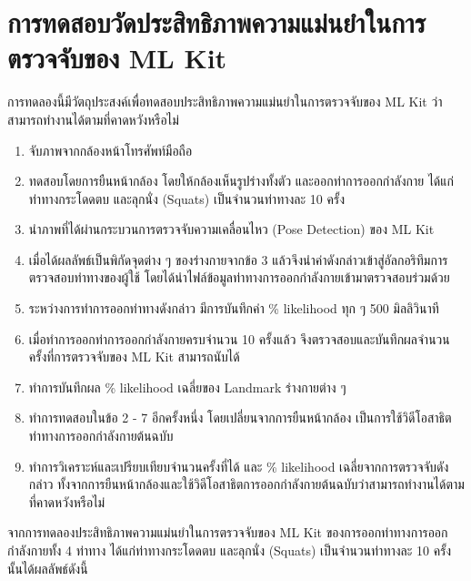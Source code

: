 \section{การทดสอบวัดประสิทธิภาพความแม่นยำในการตรวจจับของ ML Kit}
การทดลองนี้มีวัตถุประสงค์เพื่อทดสอบประสิทธิภาพความแม่นยำในการตรวจจับของ ML Kit ว่าสามารถทำงานได้ตามที่คาดหวังหรือไม่
\begin{enumerate}
	\item จับภาพจากกล้องหน้าโทรศัพท์มือถือ
	\item ทดสอบโดยการยืนหน้ากล้อง โดยให้กล้องเห็นรูปร่างทั้งตัว และออกท่าการออกกำลังกาย ได้แก่ท่าทางกระโดดตบ และลุกนั่ง (Squats) เป็นจำนวนท่าทางละ 10 ครั้ง
	\item นำภาพที่ได้ผ่านกระบวนการตรวจจับความเคลื่อนไหว (Pose Detection) ของ ML Kit
	\item เมื่อได้ผลลัพธ์เป็นพิกัดจุดต่าง ๆ ของร่างกายจากข้อ 3 แล้วจึงนำค่าดังกล่าวเข้าสู่อัลกอริทึมการตรวจสอบท่าทางของผู้ใช้ โดยได้นำไฟล์ข้อมูลท่าทางการออกกำลังกายเข้ามาตรวจสอบร่วมด้วย
	\item ระหว่างการทำการออกท่าทางดังกล่าว มีการบันทึกค่า \% likelihood ทุก ๆ 500 มิลลิวินาที
	\item เมื่อทำการออกท่าการออกกำลังกายครบจำนวน 10 ครั้งแล้ว จึงตรวจสอบและบันทึกผลจำนวนครั้งที่การตรวจจับของ ML Kit สามารถนับได้
	\item ทำการบันทึกผล \% likelihood เฉลี่ยของ Landmark ร่างกายต่าง ๆ
	\item ทำการทดสอบในข้อ 2 - 7 อีกครั้งหนึ่ง โดยเปลี่ยนจากการยืนหน้ากล้อง เป็นการใช้วิดีโอสาธิตท่าทางการออกกำลังกายต้นฉบับ
	\item ทำการวิเคราะห์และเปรียบเทียบจำนวนครั้งที่ได้ และ \% likelihood เฉลี่ยจากการตรวจจับดังกล่าว ทั้งจากการยืนหน้ากล้องและใช้วิดีโอสาธิตการออกกำลังกายต้นฉบับว่าสามารถทำงานได้ตามที่คาดหวังหรือไม่
\end{enumerate}

จากการทดลองประสิทธิภาพความแม่นยำในการตรวจจับของ ML Kit ของการออกท่าทางการออกกำลังกายทั้ง 4 ท่าทาง ได้แก่ท่าทางกระโดดตบ และลุกนั่ง (Squats) เป็นจำนวนท่าทางละ 10 ครั้งนั้นได้ผลลัพธ์ดังนี้

